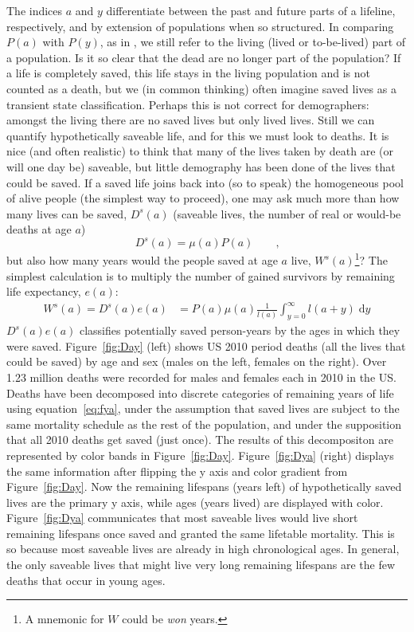 \documentclass{article}
\newcommand{\dd}{\; \mathrm{d}}
\begin{document}
The indices $a$ and $y$ differentiate between the past and future
parts of a lifeline, respectively, and by extension of populations when
so structured.
In comparing $P(a)$ with $P(y)$, as in \citet{brouard1986structure}, we still
refer to the living (lived or to-be-lived) part of a population.
Is it so clear that the dead are no longer part of the population? If a life is
completely saved, this life stays in the living population and is not counted
as a death, but we (in common thinking) often imagine saved lives as a transient
state classification.
Perhaps this is not correct for demographers: amongst the living there
are no saved lives but only lived lives. Still we can quantify
hypothetically saveable life, and for this we must look to deaths.
It is nice (and often realistic) to think that many of the lives taken by death are (or will one day be) saveable, but little demography has been done of the lives that could be saved. If a saved life joins back into (so to speak) the homogeneous pool of alive people (the simplest way
to proceed), one may ask much more than how many lives can be saved, $D^s(a)$
(saveable lives, the number of real or would-be deaths at age $a$)
\begin{equation}
D^s(a) = \mu(a)P(a) \quad \quad \text{,}
\end{equation}
but also how many years would the people saved at age $a$ live,
$W^s(a)$\footnote{A mnemonic for $W$ could be \textit{won} years.}? The simplest
calculation is to multiply the number of gained survivors by remaining life expectancy, $e(a)$:
\begin{align}
\label{eq:savedea}
W^s(a) = D^s(a)e(a) &= P(a)\mu(a)\frac{1}{l(a)}\int_{y=0}^\infty l(a+y) \dd y
\end{align}
$D^s(a)e(a)$ classifies potentially saved person-years by the
ages in which they were saved. Figure~\ref{fig:Day} (left) shows US 2010 period
deaths (all the lives that could be saved) by age and sex (males on the left,
females on the right). Over 1.23 million deaths were recorded for males
and females each in 2010 in the US. Deaths have been decomposed into discrete
categories of remaining years of life using equation~\eqref{eq:fya}, under the assumption that saved lives are subject to the same mortality schedule as the rest of the population, and under the supposition that all 2010 deaths get saved (just once). The results of this decompositon are represented by color bands in
Figure~\ref{fig:Day}. Figure~\ref{fig:Dya} (right) displays the same
information after flipping the y axis and color gradient from
Figure~\ref{fig:Day}. Now the remaining lifespans (years left) of
hypothetically saved lives are the primary y axis, while ages (years lived)
are displayed with color. Figure~\ref{fig:Dya} communicates that most saveable
lives would live short remaining lifespans once saved and granted the same lifetable
mortality. This is so because most saveable lives are already in high
chronological ages. In general, the only saveable lives that might live very
long remaining lifespans are the few deaths that occur in young ages.
\end{document}
